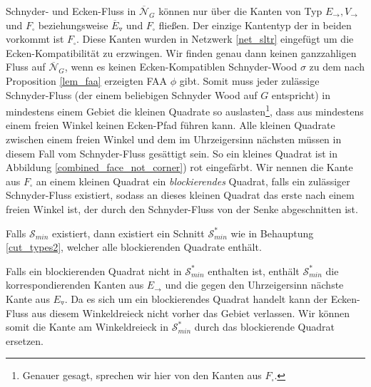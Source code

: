 Schnyder- und Ecken-Fluss in $\overline{\mathcal{N}}_G$ können nur über die Kanten von Typ $E_\to, V_\to$ und $F_\square$ beziehungsweise $\overline{E}_\triangledown$ und $F_\square$ fließen. Der einzige Kantentyp der in beiden vorkommt ist $F_\square$. Diese Kanten wurden in Netzwerk \ref{net_sltr} eingefügt um die Ecken-Kompatibilität zu erzwingen. Wir finden genau dann keinen ganzzahligen Fluss auf $\overline{\mathcal{N}}_G$, wenn es keinen Ecken-Kompatiblen Schnyder-Wood $\sigma$ zu dem nach Proposition \ref{lem_faa} erzeigten FAA $\phi$ gibt. Somit muss jeder zulässige Schnyder-Fluss (der einem beliebigen Schnyder Wood auf $G$ entspricht) in mindestens einem Gebiet die kleinen Quadrate so auslasten\footnote{Genauer gesagt, sprechen wir hier von den Kanten aus $F_\square$.}, dass aus mindestens einem freien Winkel keinen Ecken-Pfad führen kann. Alle kleinen Quadrate zwischen einem freien Winkel und dem im Uhrzeigersinn nächsten müssen in diesem Fall vom Schnyder-Fluss gesättigt sein. So ein kleines Quadrat ist in Abbildung \ref{combined_face_not_corner}) rot eingefärbt. Wir nennen die Kante aus $F_\square$ an einem kleinen Quadrat ein \textit{blockierendes} Quadrat, falls ein zulässiger Schnyder-Fluss existiert, sodass an dieses kleinen Quadrat das erste nach einem freien Winkel ist, der durch den Schnyder-Fluss von der Senke abgeschnitten ist.

\begin{claim}
Falls $\mathcal{S}_{min}$ existiert, dann existiert ein Schnitt $\mathcal{S}^*_{min}$ wie in Behauptung \ref{cut_types2}, welcher alle blockierenden Quadrate enthält.
\end{claim}

Falls ein blockierenden Quadrat nicht in $\mathcal{S}^*_{min}$ enthalten ist, enthält $\mathcal{S}^*_{min}$ die korrespondierenden Kanten aus $E_\to$ und die gegen den Uhrzeigersinn nächste Kante aus $E_\triangledown$. Da es sich um ein blockierendes Quadrat handelt kann der Ecken-Fluss aus diesem Winkeldreieck nicht vorher das Gebiet verlassen. Wir können somit die Kante am Winkeldreieck in $\mathcal{S}^*_{min}$ durch das blockierende Quadrat ersetzen. \\

